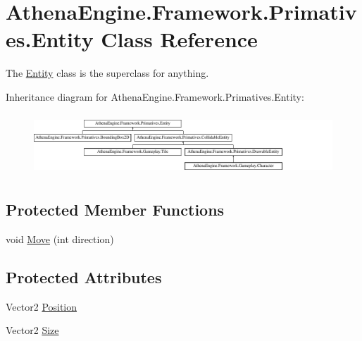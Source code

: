 \hypertarget{class_athena_engine_1_1_framework_1_1_primatives_1_1_entity}{\section{Athena\-Engine.\-Framework.\-Primatives.\-Entity Class Reference}
\label{class_athena_engine_1_1_framework_1_1_primatives_1_1_entity}
}


The \hyperlink{class_athena_engine_1_1_framework_1_1_primatives_1_1_entity}{Entity} class is the superclass for anything.  


Inheritance diagram for Athena\-Engine.\-Framework.\-Primatives.\-Entity\-:\begin{figure}[H]
\begin{center}
\leavevmode
\includegraphics[height=2.318841cm]{class_athena_engine_1_1_framework_1_1_primatives_1_1_entity}
\end{center}
\end{figure}
\subsection*{Protected Member Functions}
\begin{DoxyCompactItemize}
\item 
void \hyperlink{class_athena_engine_1_1_framework_1_1_primatives_1_1_entity_aab38aec8a3dd6ff1f0e998cb9ddb1d8f}{Move} (int direction)
\end{DoxyCompactItemize}
\subsection*{Protected Attributes}
\begin{DoxyCompactItemize}
\item 
Vector2 \hyperlink{class_athena_engine_1_1_framework_1_1_primatives_1_1_entity_af9ff3668f77796ab35a5f8c4b1640813}{Position}
\item 
Vector2 \hyperlink{class_athena_engine_1_1_framework_1_1_primatives_1_1_entity_ab97b4ce403d33c60d7613d4ac46ce523}{Size}
\end{DoxyCompactItemize}
